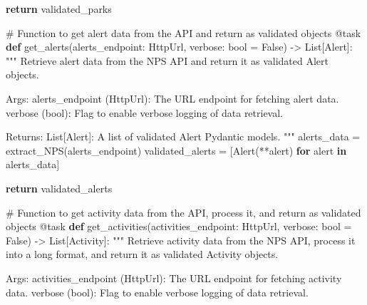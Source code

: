 \documentclass[
  letterpaper,
  DIV=11,
  numbers=noendperiod]{scrartcl}
\newenvironment{Shaded}{\begin{snugshade}}{\end{snugshade}}
\newcommand{\AttributeTok}[1]{\textcolor[rgb]{0.40,0.45,0.13}{#1}}
\newcommand{\BuiltInTok}[1]{\textcolor[rgb]{0.00,0.23,0.31}{#1}}
\newcommand{\CommentTok}[1]{\textcolor[rgb]{0.37,0.37,0.37}{#1}}
\newcommand{\ControlFlowTok}[1]{\textcolor[rgb]{0.00,0.23,0.31}{\textbf{#1}}}
\newcommand{\KeywordTok}[1]{\textcolor[rgb]{0.00,0.23,0.31}{\textbf{#1}}}
\newcommand{\NormalTok}[1]{\textcolor[rgb]{0.00,0.23,0.31}{#1}}
\newcommand{\OperatorTok}[1]{\textcolor[rgb]{0.37,0.37,0.37}{#1}}
\newcommand{\VariableTok}[1]{\textcolor[rgb]{0.07,0.07,0.07}{#1}}
\begin{document}
\begin{Shaded}
\begin{Highlighting}[]
    \ControlFlowTok{return}\NormalTok{ validated\_parks}

\CommentTok{\# Function to get alert data from the API and return as validated objects}
\AttributeTok{@task}
\KeywordTok{def}\NormalTok{ get\_alerts(alerts\_endpoint: HttpUrl, verbose: }\BuiltInTok{bool} \OperatorTok{=} \VariableTok{False}\NormalTok{) }\OperatorTok{{-}\textgreater{}}\NormalTok{ List[Alert]:}
    \CommentTok{"""}
\CommentTok{    Retrieve alert data from the NPS API and return it as validated Alert objects.}

\CommentTok{    Args:}
\CommentTok{        alerts\_endpoint (HttpUrl): The URL endpoint for fetching alert data.}
\CommentTok{        verbose (bool): Flag to enable verbose logging of data retrieval.}

\CommentTok{    Returns:}
\CommentTok{        List[Alert]: A list of validated Alert Pydantic models.}
\CommentTok{    """}
\NormalTok{    alerts\_data }\OperatorTok{=}\NormalTok{ extract\_NPS(alerts\_endpoint)}
\NormalTok{    validated\_alerts }\OperatorTok{=}\NormalTok{ [Alert(}\OperatorTok{**}\NormalTok{alert) }\ControlFlowTok{for}\NormalTok{ alert }\KeywordTok{in}\NormalTok{ alerts\_data]}

    \ControlFlowTok{return}\NormalTok{ validated\_alerts}

\CommentTok{\# Function to get activity data from the API, process it, and return as validated objects}
\AttributeTok{@task}
\KeywordTok{def}\NormalTok{ get\_activities(activities\_endpoint: HttpUrl, verbose: }\BuiltInTok{bool} \OperatorTok{=} \VariableTok{False}\NormalTok{) }\OperatorTok{{-}\textgreater{}}\NormalTok{ List[Activity]:}
    \CommentTok{"""}
\CommentTok{    Retrieve activity data from the NPS API, process it into a long format,}
\CommentTok{    and return it as validated Activity objects.}

\CommentTok{    Args:}
\CommentTok{        activities\_endpoint (HttpUrl): The URL endpoint for fetching activity data.}
\CommentTok{        verbose (bool): Flag to enable verbose logging of data retrieval.}


\end{Highlighting}
\end{Shaded}
\end{document}
